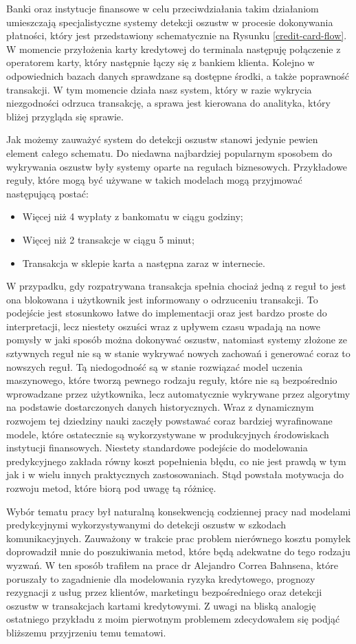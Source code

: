 \documentclass[inzynierska]{pwr_wmat_praca_dyplomowa}
\theoremstyle{plain}
\numberwithin{theorem}{chapter}
\theoremstyle{definition}
\numberwithin{theorem}{chapter}
\begin{document}
Banki oraz instytucje finansowe w celu przeciwdziałania takim działaniom umieszczają specjalistyczne systemy detekcji oszustw w procesie dokonywania płatności, który jest przedstawiony schematycznie na Rysunku \ref{credit-card-flow}. W momencie przyłożenia karty kredytowej do terminala następuję połączenie z operatorem karty, który następnie łączy się z bankiem klienta. Kolejno w odpowiednich bazach danych sprawdzane są dostępne środki, a także poprawność transakcji. W tym momencie działa nasz system, który w razie wykrycia niezgodności odrzuca transakcję, a sprawa jest kierowana do analityka, który bliżej przygląda się sprawie.

Jak możemy zauważyć system do detekcji oszustw stanowi jedynie pewien element całego schematu. Do niedawna najbardziej popularnym sposobem do wykrywania oszustw były systemy oparte na regułach biznesowych. Przykładowe reguły, które mogą być używane w takich modelach mogą przyjmować następującą postać:
\begin{itemize}
	\item Więcej niż 4 wypłaty z bankomatu w ciągu godziny;
	\item Więcej niż 2 transakcje w ciągu 5 minut;
	\item Transakcja w sklepie karta a następna zaraz w internecie.
\end{itemize}
W przypadku, gdy rozpatrywana transakcja spełnia chociaż jedną z reguł to jest ona blokowana i użytkownik jest informowany o odrzuceniu transakcji. To podejście jest stosunkowo łatwe do implementacji oraz jest bardzo proste do interpretacji, lecz niestety oszuści wraz z upływem czasu wpadają na nowe pomysły w jaki sposób można dokonywać oszustw, natomiast systemy złożone ze sztywnych reguł nie są w stanie wykrywać nowych zachowań i generować coraz to nowszych reguł. Tą niedogodność są w stanie rozwiązać model uczenia maszynowego, które tworzą pewnego rodzaju reguły, które nie są bezpośrednio wprowadzane przez użytkownika, lecz automatycznie wykrywane przez algorytmy na podstawie dostarczonych danych historycznych. Wraz z dynamicznym rozwojem tej dziedziny nauki zaczęły powstawać coraz bardziej wyrafinowane modele, które ostatecznie są wykorzystywane w produkcyjnych środowiskach instytucji finansowych. Niestety standardowe podejście do modelowania predykcyjnego zakłada równy koszt popełnienia błędu, co nie jest prawdą w tym jak i w wielu innych praktycznych zastosowaniach. Stąd powstała motywacja do rozwoju metod, które biorą pod uwagę tą różnicę.

Wybór tematu pracy był naturalną konsekwencją codziennej pracy nad modelami predykcyjnymi wykorzystywanymi do detekcji oszustw w szkodach komunikacyjnych. Zauważony w trakcie prac problem nierównego kosztu pomyłek doprowadził mnie do poszukiwania metod, które będą adekwatne do tego rodzaju wyzwań. W ten sposób trafiłem na prace dr Alejandro Correa Bahnsena, które poruszały to zagadnienie dla modelowania ryzyka kredytowego, prognozy rezygnacji z usług przez klientów, marketingu bezpośredniego oraz detekcji oszustw w transakcjach kartami kredytowymi. Z uwagi na bliską analogię ostatniego przykładu z moim pierwotnym problemem zdecydowałem się podjąć bliższemu przyjrzeniu temu tematowi.
\end{document}
